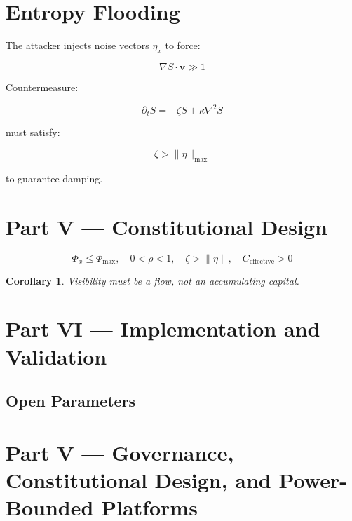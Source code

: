 \documentclass[11pt,a4paper]{article}
\theoremstyle{plain}
\newtheorem{corollary}{Corollary}[section]
\theoremstyle{definition}
\theoremstyle{remark}
\newcommand{\vvec}{\mathbf{v}}
\newcommand{\Entropy}{S}
\begin{document}
\section{Entropy Flooding}

The attacker injects noise vectors $\eta_x$ to force:

\[
\nabla \Entropy \cdot \vvec \gg 1
\]

Countermeasure:

\[
\partial_t \Entropy = -\zeta \Entropy + \kappa \nabla^2 \Entropy
\]

must satisfy:

\[
\zeta > \|\eta\|_{\max}
\]

to guarantee damping.

\section*{Part V — Constitutional Design}

\[
\Phi_x \le \Phi_{\max}, \quad 0 < \rho < 1, \quad \zeta > \|\eta\|, \quad C_{\text{effective}} > 0
\]

\begin{corollary}
Visibility must be a flow, not an accumulating capital.
\end{corollary}


\section*{Part VI — Implementation and Validation}

\subsection{Open Parameters}

\section*{Part V — Governance, Constitutional Design, and Power-Bounded Platforms}
\end{document}
